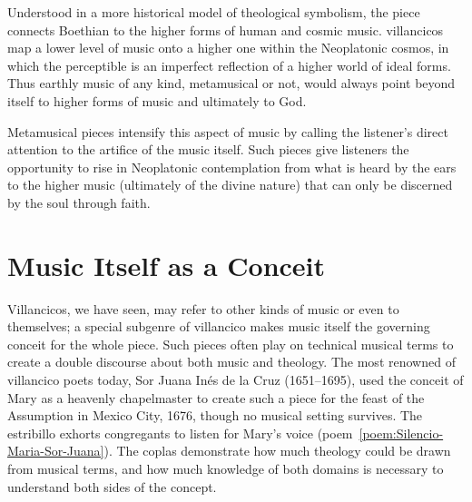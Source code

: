 Understood in a more historical model of theological symbolism, the piece connects Boethian  to the higher forms of human and cosmic music. 
 villancicos map a lower level of music onto a higher one within the Neoplatonic cosmos, in which the perceptible  is an imperfect reflection of a higher world of ideal forms.
Thus earthly music of any kind, metamusical or not, would always point beyond itself to higher forms of music and ultimately to God.

Metamusical pieces intensify this aspect of music by calling the listener's direct attention to the artifice of the music itself.
Such pieces give listeners the opportunity to rise in Neoplatonic contemplation from what is heard by the ears to the higher music (ultimately of the divine nature) that can only be discerned by the soul through faith.

\section{Music Itself as a Conceit}

Villancicos, we have seen, may refer to other kinds of music or even to themselves; a special subgenre of villancico makes music itself the governing conceit for the whole piece.
Such pieces often play on technical musical terms to create a double discourse about both music and theology.
The most renowned of villancico poets today, Sor Juana Inés de la Cruz (1651--1695), used the conceit of Mary as a heavenly chapelmaster to create such a piece for the feast of the Assumption in Mexico City, 1676, though no musical setting survives.%
	\autocite[no.~220, p.~7]{SorJuana:VC}
The estribillo exhorts congregants to listen for Mary's voice (poem~\ref{poem:Silencio-Maria-Sor-Juana}).
The coplas demonstrate how much theology could be drawn from musical terms, and how much knowledge of both domains is necessary to understand both sides of the concept.

%	

